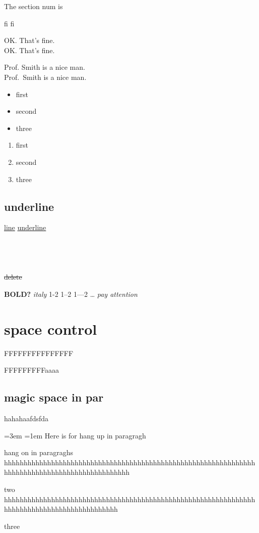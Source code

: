 \documentclass{article}
\begin{document}
The section num is \thesection

fi   f\mbox{}i

OK. That's fine.\\
OK\@. That's fine.

Prof. Smith is a nice man.\\
Prof.~Smith is a nice man.

\XBox \male \female \phone \checked \twonotes

\begin{itemize}
    \item[+] first
    \item[*] second
    \item[\LaTeX] three
\end{itemize}
\begin{enumerate}
    \item first
    \item second
    \item three
\end{enumerate}

\subsection{underline}
\uline{line}
\uline{underline} \\
 \\
 \\
 \\
 \\
\sout{delete} \\

\textbf{BOLD?}
\textit{italy}
1-2
1--2
1---2
\ldots
\emph{pay attention}
\section{space control}

FFFFFFFFFFFFFFF

FFFFFFFFFaaaa

\subsection{magic space in par}


{\parbox[t]{2em}{hahahaafdsfda}}


{
\leftskip=3em
\parindent=1em
Here is for hang up in paragragh

hang on in paragraghs hhhhhhhhhhhhhhhhhhhhhhhhhhhhhhhhhhhhhhhhhhhhhhhhhhhhhhhhhhhhhhhhhhhhhhhhhhhhhhhhhhhhhhhhhhhhhhhh

two hhhhhhhhhhhhhhhhhhhhhhhhhhhhhhhhhhhhhhhhhhhhhhhhhhhhhhhhhhhhhhhhhhhhhhhhhhhhhhhhhhhhhhhhhhhhh

three

}
\end{document}
